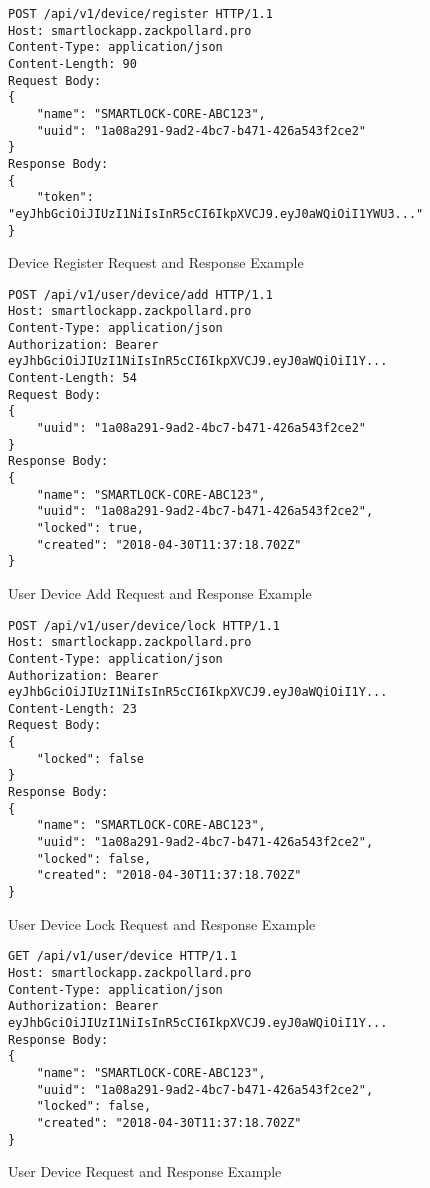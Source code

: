 \begin{figure}[H]
	\caption{Device Register Request and Response Example}
	\begin{Verbatim}[frame=single]
POST /api/v1/device/register HTTP/1.1
Host: smartlockapp.zackpollard.pro
Content-Type: application/json
Content-Length: 90
Request Body:
{
	"name": "SMARTLOCK-CORE-ABC123",
	"uuid": "1a08a291-9ad2-4bc7-b471-426a543f2ce2"
}
Response Body:
{
	"token": "eyJhbGciOiJIUzI1NiIsInR5cCI6IkpXVCJ9.eyJ0aWQiOiI1YWU3..."
}
	\end{Verbatim}
\end{figure}

\begin{figure}[H]
	\caption{User Device Add Request and Response Example}
	\begin{Verbatim}[frame=single]
POST /api/v1/user/device/add HTTP/1.1
Host: smartlockapp.zackpollard.pro
Content-Type: application/json
Authorization: Bearer eyJhbGciOiJIUzI1NiIsInR5cCI6IkpXVCJ9.eyJ0aWQiOiI1Y...
Content-Length: 54
Request Body:
{
	"uuid": "1a08a291-9ad2-4bc7-b471-426a543f2ce2"
}
Response Body:
{
	"name": "SMARTLOCK-CORE-ABC123",
	"uuid": "1a08a291-9ad2-4bc7-b471-426a543f2ce2",
	"locked": true,
	"created": "2018-04-30T11:37:18.702Z"
}
	\end{Verbatim}
\end{figure}

\begin{figure}[H]
	\caption{User Device Lock Request and Response Example}
	\begin{Verbatim}[frame=single]
POST /api/v1/user/device/lock HTTP/1.1
Host: smartlockapp.zackpollard.pro
Content-Type: application/json
Authorization: Bearer eyJhbGciOiJIUzI1NiIsInR5cCI6IkpXVCJ9.eyJ0aWQiOiI1Y...
Content-Length: 23
Request Body:
{
	"locked": false
}
Response Body:
{
	"name": "SMARTLOCK-CORE-ABC123",
	"uuid": "1a08a291-9ad2-4bc7-b471-426a543f2ce2",
	"locked": false,
	"created": "2018-04-30T11:37:18.702Z"
}
	\end{Verbatim}
\end{figure}

\begin{figure}[H]
	\caption{User Device Request and Response Example}
	\begin{Verbatim}[frame=single]
GET /api/v1/user/device HTTP/1.1
Host: smartlockapp.zackpollard.pro
Content-Type: application/json
Authorization: Bearer eyJhbGciOiJIUzI1NiIsInR5cCI6IkpXVCJ9.eyJ0aWQiOiI1Y...
Response Body:
{
	"name": "SMARTLOCK-CORE-ABC123",
	"uuid": "1a08a291-9ad2-4bc7-b471-426a543f2ce2",
	"locked": false,
	"created": "2018-04-30T11:37:18.702Z"
}
	\end{Verbatim}
\end{figure}

